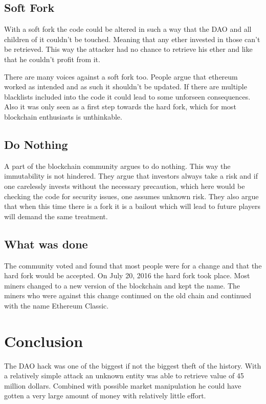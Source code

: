 \documentclass[a4paper, 11pt]{scrartcl}
\begin{document}
\subsection{Soft Fork}

With a soft fork the code could be altered in such a way that the DAO and all children of it couldn't be touched. Meaning that any ether invested in those can't be retrieved. This way the attacker had no chance to retrieve his ether and like that he couldn't profit from it. \cite{understandingDAO}

There are many voices against a soft fork too. People argue that ethereum worked as intended and as such it shouldn't be updated. If there are multiple blacklists included into the code it could lead to some unforseen consequences. Also it was only seen as a first step towards the hard fork, which for most blockchain enthusiasts is unthinkable. \cite{understandingDAO}

\subsection{Do Nothing}

A part of the blockchain community argues to do nothing. This way the immutability is not hindered. They argue that investors always take a risk and if one carelessly invests without the necessary precaution, which here would be checking the code for security issues, one assumes unknown risk. They also argue that when this time there is a fork it is a bailout which will lead to future players will demand the same treatment. \cite{understandingDAO}

\subsection{What was done}

The community voted and found that most people were for a change and that the hard fork would be accepted. On July 20, 2016 the hard fork took place. Most miners changed to a new version of the blockchain and kept the name. The miners who were against this change continued on the old chain and continued with the name Ethereum Classic. \cite{fork}

\section{Conclusion}

The DAO hack was one of the biggest if not the biggest theft of the history. With a relatively simple attack an unknown entity was able to retrieve value of 45 million dollars. Combined with possible market manipulation he could have gotten a very large amount of money with relatively little effort. 
\end{document}
